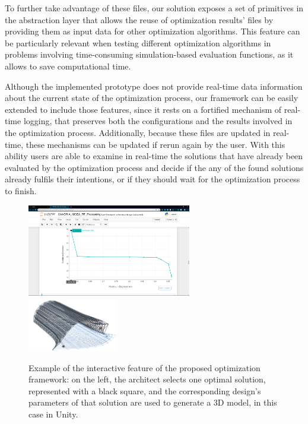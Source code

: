 To further take advantage of these files, our solution exposes a set of primitives in the abstraction layer that allows the reuse of optimization results' files by providing them as input data for other optimization algorithms. This feature can be particularly relevant when testing different optimization algorithms in problems involving time-consuming simulation-based evaluation functions, as it allows to save computational time.


Although the implemented prototype does not provide real-time data information about the current state of the optimization process, our framework can be easily extended to include those features, since it rests on a fortified mechanism of real-time logging, that preserves both the configurations and the results involved in the optimization process. Additionally, because these files are updated in real-time, these mechanisms can be updated if rerun again by the user. With this ability users are able to examine in real-time the solutions that have already been evaluated by the optimization process and decide if the any of the found solutions already fulfils their intentions, or if they should wait for the optimization process to finish. 

\begin{figure}[htbp]
	\centering
	\includegraphics[width=0.64\textwidth]{./Images/Solution/fake-plot-browserview-square.PNG}
	\hfill
	\includegraphics[width=0.35\textwidth]{./Images/Solution/solution1-smaller.png}
	
	\caption[Interactive Visualization of Optimization results]{Example of the interactive feature of the proposed optimization framework: on the left, the architect selects one optimal solution, represented with a black square, and the corresponding design's parameters of that solution are used to generate a 3D model, in this case in Unity.}
	\label{fig:interactivefeature}
\end{figure}

